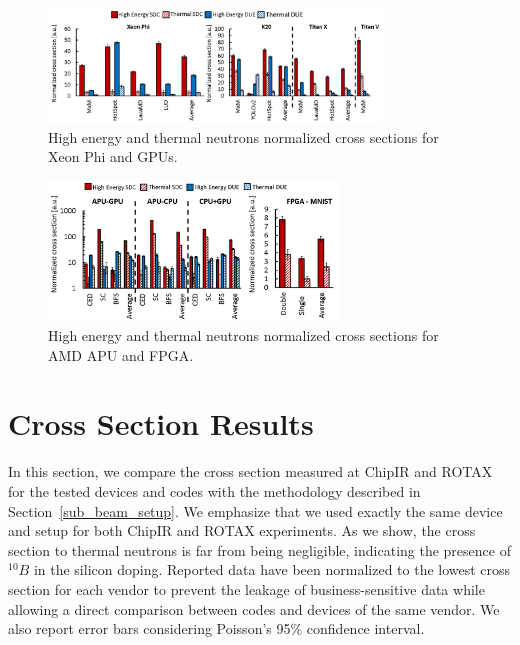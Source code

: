 \begin{figure}[tbh]
	\centering
	\includegraphics[width=0.79\textwidth]{./data/plots_final/cs_xeon_gpus_avg.png}
	\caption{High energy and thermal neutrons normalized cross sections for Xeon Phi and GPUs.}
	\label{cs_xeon_gpus}
\end{figure}

\begin{figure}[th]
	\centering
	\includegraphics[width=0.69\textwidth]{./data/plots_final/cs_APU_FPGA_avg.png}
	\caption{High energy and thermal neutrons normalized cross sections for AMD APU and FPGA.}
	\label{cs_apu_fpga}
\end{figure}

\section{Cross Section Results}
\label{sec_results}

In this section, we compare the cross section measured at ChipIR and ROTAX for the tested devices and codes with the methodology described in Section~\ref{sub_beam_setup}. We emphasize that we used exactly the same device and setup for both ChipIR and ROTAX experiments. %
As we show, the cross section to thermal neutrons is far from being negligible, indicating the presence of $^{10}B$ in the silicon doping. Reported data have been normalized to the lowest cross section for each vendor to prevent the leakage of business-sensitive data while allowing a direct comparison between codes and devices of the same vendor. We also report error bars considering Poisson's 95\% confidence interval.

